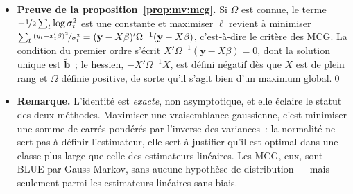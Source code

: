 \documentclass[10pt]{beamer}
\begin{document}
\begin{notes}

  \begin{itemize}

  \item \textbf{Preuve de la proposition~\ref{prop:mv:mcg}.} Si $\Omega$ est
    connue, le terme $-\nicefrac{1}{2}\sum_t\log\sigma_t^2$ est une constante et
    maximiser $\ell$ revient à minimiser
    $\sum_t\nicefrac{(y_t-x_t'\beta)^2}{\sigma_t^2} =
    (\mathbf y - X\beta)'\Omega^{-1}(\mathbf y - X\beta)$,
    c'est-à-dire le critère des MCG\@. La condition du premier ordre s'écrit
    $X'\Omega^{-1}(\mathbf y - X\beta) = 0$, dont la solution unique est
    $\tilde{\mathbf b}$~; le hessien, $-X'\Omega^{-1}X$, est défini négatif dès
    que $X$ est de plein rang et $\Omega$ définie positive, de sorte qu'il
    s'agit bien d'un maximum global.\qed\newline

  \item \textbf{Remarque.} L'identité est \emph{exacte}, non asymptotique, et
    elle éclaire le statut des deux méthodes. Maximiser une vraisemblance
    gaussienne, c'est minimiser une somme de carrés pondérés par l'inverse des
    variances~: la normalité ne sert pas à définir l'estimateur, elle sert à
    justifier qu'il est optimal dans une classe plus large que celle des
    estimateurs linéaires. Les MCG, eux, sont BLUE par Gauss-Markov, sans
    aucune hypothèse de distribution — mais seulement parmi les estimateurs
    linéaires sans biais.

  \end{itemize}

\end{notes}
\end{document}
